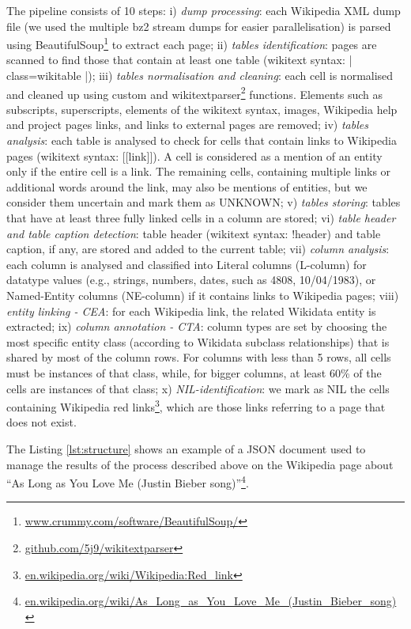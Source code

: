 The pipeline consists of 10 steps: i) \textit{dump processing}: each Wikipedia XML dump file (we used the multiple bz2 stream dumps for easier parallelisation) is parsed using BeautifulSoup\footnote{\href{https://www.crummy.com/software/BeautifulSoup/}{www.crummy.com/software/BeautifulSoup/}} to extract each page;
ii) \textit{tables identification}: pages are scanned to find those that contain at least one table (wikitext syntax: {| class=wikitable |});
iii) \textit{tables normalisation and cleaning}: each cell is normalised and cleaned up using custom and wikitextparser\footnote{\href{https://github.com/5j9/wikitextparser}{github.com/5j9/wikitextparser}} functions. Elements such as subscripts, superscripts, elements of the wikitext syntax, images, Wikipedia help and project pages links, and links to external pages are removed;
iv) \textit{tables analysis}: each table is analysed to check for cells that contain links to Wikipedia pages (wikitext syntax: [[link]]). A cell is considered as a mention of an entity only if the entire cell is a link. The remaining cells, containing multiple links or additional words around the link, may also be mentions of entities, but we consider them uncertain and mark them as UNKNOWN;
v) \textit{tables storing}: tables that have at least three fully linked cells in a column are stored;
vi) \textit{table header and table caption detection}: table header (wikitext syntax: !header) and table caption, if any, are stored and added to the current table;
vii) \textit{column analysis}: each column is analysed and classified into Literal columns (L-column) for datatype values (e.g., strings, numbers, dates, such as 4808, 10/04/1983), or Named-Entity columns (NE-column) if it contains links to Wikipedia pages;
viii) \textit{entity linking - CEA}: for each Wikipedia link, the related Wikidata entity is extracted;
ix) \textit{column annotation - CTA}: column types are set by choosing the most specific entity class (according to Wikidata subclass relationships) that is shared by most of the column rows. For columns with less than 5 rows, all cells must be instances of that class, while, for bigger columns, at least 60\% of the cells are instances of that class;
x) \textit{NIL-identification}: we mark as NIL the cells containing Wikipedia red links\footnote{\href{https://en.wikipedia.org/wiki/Wikipedia:Red_link}{en.wikipedia.org/wiki/Wikipedia:Red\_link}}, which are those links referring to a page that does not exist.

The Listing \ref{lst:structure} shows an example of a JSON document used to manage the results of the process described above on the Wikipedia page about ``As Long as You Love Me (Justin Bieber song)''\footnote{\href{https://en.wikipedia.org/wiki/As\_Long\_as\_You\_Love\_Me\_(Justin\_Bieber\_song)}{en.wikipedia.org/wiki/As\_Long\_as\_You\_Love\_Me\_(Justin\_Bieber\_song)}}.

